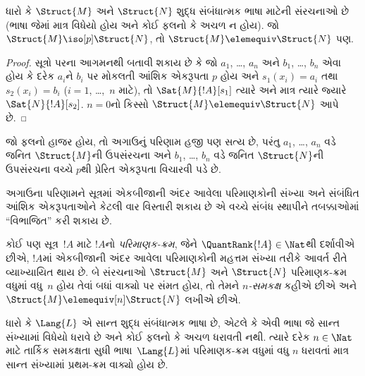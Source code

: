 \begin{thm}
  ધારો કે $\Struct{M}$ અને $\Struct{N}$ શુદ્ધ સંબંધાત્મક
  ભાષા માટેની સંરચનાઓ છે (ભાષા જેમાં માત્ર
  વિધેયો હોય અને કોઈ ફલનો કે અચળ ન હોય). જો
  $\Struct{M} \iso[p] \Struct{N}$, તો $\Struct{M} \elemequiv
  \Struct{N}$ પણ.
\end{thm}

\begin{proof}
  સૂત્રો પરના આગમનથી બતાવી શકાય છે કે જો $a_1$, \dots, $a_n$ અને
  $b_1$, \dots, $b_n$ એવા હોય કે દરેક $a_i$ને $b_i$ પર મોકલતી આંશિક
  એકરૂપતા $p$ હોય અને $s_1(x_i) =a_i$ તથા $s_2(x_i) =b_i$
  ($i =1$, \dots,~$n$ માટે), તો $\Sat{M}{!A}[s_1]$ ત્યારે અને માત્ર
  ત્યારે જ્યારે $\Sat{N}{!A}[s_2]$. $n=0$નો કિસ્સો
  $\Struct{M} \elemequiv \Struct{N}$ આપે છે.
\end{proof}

\begin{rem}
જો ફલનો હાજર હોય, તો અગાઉનું પરિણામ હજી પણ સત્ય છે, પરંતુ
$a_1$, \dots, $a_n$ વડે જનિત $\Struct{M}$ની ઉપસંરચના અને
$b_1$, \dots, $b_n$ વડે જનિત $\Struct{N}$ની ઉપસંરચના વચ્ચે
$p$થી પ્રેરિત એકરૂપતા વિચારવી પડે છે.
\end{rem}

અગાઉના પરિણામને સૂત્રમાં એકબીજાની અંદર આવેલા પરિમાણકોની સંખ્યા
અને સંબંધિત આંશિક એકરૂપતાઓને કેટલી વાર વિસ્તારી શકાય છે એ વચ્ચે સંબંધ
સ્થાપીને તબક્કાઓમાં ``વિભાજિત'' કરી શકાય છે.

\begin{defn}
  કોઈ પણ સૂત્ર~$!A$ માટે $!A$નો \emph{પરિમાણક-ક્રમ}, જેને
  $\QuantRank{!A} \in \Nat$થી દર્શાવીએ છીએ, $!A$માં એકબીજાની અંદર
  આવેલા પરિમાણકોની મહત્તમ સંખ્યા તરીકે આવર્ત રીતે વ્યાખ્યાયિત થાય છે.
  બે સંરચનાઓ $\Struct{M}$ અને $\Struct{N}$ પરિમાણક-ક્રમ વધુમાં
  વધુ~$n$ હોય તેવાં બધાં વાક્યો પર સંમત હોય, તો તેમને
  \emph{$n$-સમકક્ષ} કહીએ છીએ અને $\Struct{M} \elemequiv[n]
  \Struct{N}$ લખીએ છીએ.
\end{defn}

\begin{prop}
  ધારો કે $\Lang{L}$ એ સાન્ત શુદ્ધ સંબંધાત્મક ભાષા છે, એટલે કે
  એવી ભાષા જે સાન્ત સંખ્યામાં વિધેયો ધરાવે છે અને કોઈ
  ફલનો કે અચળ ધરાવતી નથી. ત્યારે દરેક $n \in \Nat$ માટે તાર્કિક સમકક્ષતા
  સુધી ભાષા~$\Lang{L}$માં પરિમાણક-ક્રમ વધુમાં વધુ $n$ ધરાવતાં માત્ર સાન્ત
  સંખ્યામાં પ્રથમ-ક્રમ વાક્યો હોય છે.
\end{prop}

